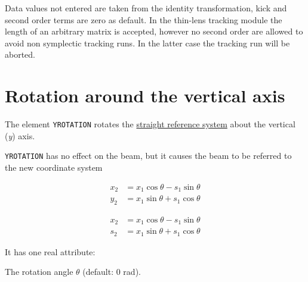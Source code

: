 Data values not entered are taken from the identity transformation, kick
and second order terms are zero as default. In the thin-lens tracking
module the length of an arbitrary matrix is accepted, however no second
order are allowed to avoid non symplectic tracking runs. In the latter
case the tracking run will be aborted.


\section{Rotation around the vertical axis}
\label{sec:yrotation}

The element \texttt{YROTATION} rotates the
\hyperref[subsec:local-straight]{straight reference system} about the
vertical (\textit{y}) axis.


\texttt{YROTATION} has no effect on the beam, but it
causes the beam to be referred to the new coordinate system  \\
\begin{5.02.06}
\begin{equation}\begin{split}
x_2 &= x_1 \cos\theta - s_1 \sin\theta \\
y_2 &= x_1 \sin\theta + s_1 \cos\theta
\end{split}\end{equation}
\end{5.02.06}
\begin{5.02.08}
\begin{equation}\begin{split}
x_2 &= x_1 \cos\theta - s_1 \sin\theta \\
s_2 &= x_1 \sin\theta + s_1 \cos\theta
\end{split}\end{equation}
\end{5.02.08}

It has one real attribute: 
\begin{madlist}
    The rotation angle $\theta$ (default: 0 rad).  
\end{madlist}

